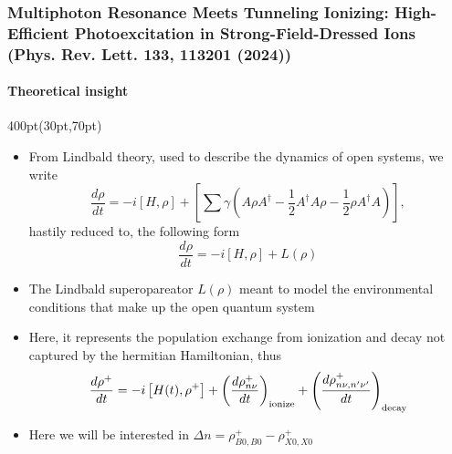 \begin{frame}
\frametitle{
Multiphoton Resonance Meets Tunneling Ionizing:
High-Efficient Photoexcitation in Strong-Field-Dressed Ions\\
\small (Phys. Rev. Lett. \textbf{133}, 113201 (2024)) 
}
\framesubtitle{Theoretical insight}


\footnotesize
\begin{textblock*}{400pt}(30pt,70pt)
\begin{itemize}
\item From Lindbald theory, used to describe the dynamics of open systems, 
we write
\begin{equation}
\frac{d\rho}{dt} = -i\left[ H, \rho\right] 
 + \left[ \sum \gamma \left(A\rho A^\dagger 
 - \frac{1}{2}A^\dagger A\rho - \frac{1}{2}\rho A^{\dagger}A\right)\right],
\end{equation}
\noindent hastily reduced to, the following form
\begin{equation}
\frac{d\rho}{dt} = -i\left[ H, \rho\right] 
 + L(\rho)
\end{equation}
\item The Lindbald superopareator $L(\rho)$ meant to model the environmental 
conditions that make up the open quantum system
\item Here, it represents the population exchange from ionization and decay
not captured by the hermitian Hamiltonian, thus
\begin{equation}
\frac{d\rho^+}{dt} = -i\left[H(t),\rho^+ \right]
+ \left(\frac{d\rho^+_{n\nu}}{dt}\right)_{\rm ionize}
+ \left(\frac{d\rho^+_{n\nu,n^\prime\nu^\prime}}{dt}\right)_{\rm decay}
\end{equation}
\item Here we will be interested in $\Delta n = \rho^+_{B0,B0}-\rho^+_{X0,X0}$
\end{itemize}
\end{textblock*}
 
\end{frame}




